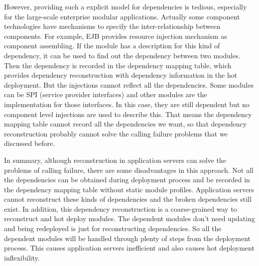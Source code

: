 \documentclass[conference]{IEEEtran}
\begin{document}
However, providing such a explicit model for dependencies is tedious, especially for the large-scale enterprise modular applications. Actually some component technologies have mechanisms to specify the inter-relationship between components. For example, EJB provides resource injection mechanism \cite{DI} as component assembling. If the module has a description for this kind of dependency, it can be used to find out the dependency between two modules. Then the dependency is recorded in the dependency mapping table, which provides dependency reconstruction with dependency information in the hot deployment. But the injections cannot reflect all the dependencies. Some modules can be SPI (service provider interfaces) and other modules are the implementation for those interfaces. In this case, they are still dependent but no component level injections are used to describe this. That means the dependency mapping table cannot record all the dependencies we want, so that dependency reconstruction probably cannot solve the calling failure problems that we discussed before.


In summary, although reconstruction in application servers can solve the problems of calling failure, there are some disadvantages in this approach.
Not all the dependencies can be obtained during deployment process and be recorded in the dependency mapping table without static module profiles.
Application servers cannot reconstruct these kinds of dependencies and the broken dependencies still exist.
In addition, this dependency reconstruction is a coarse-grained way to reconstruct and hot deploy modules.
The dependent modules don't need updating and being redeployed is just for reconstructing dependencies.
So all the dependent modules will be handled through plenty of steps from the deployment process.
This causes application servers inefficient and also causes hot deployment inflexibility.
\end{document}
